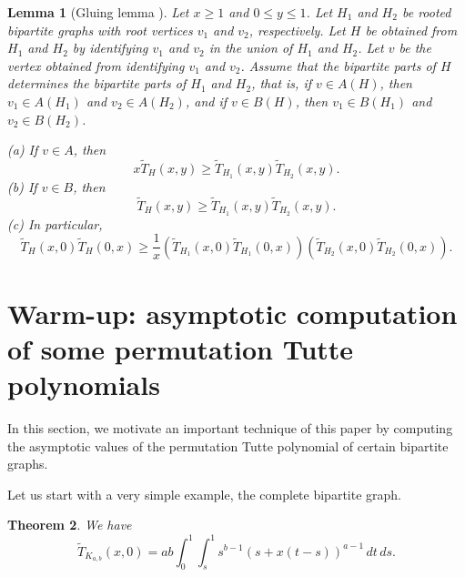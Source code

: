 \documentclass[12pt,a4paper]{amsart}
\numberwithin{equation}{section}
\theoremstyle{plain}
\newtheorem{Th}{Theorem}[section]
\newtheorem{Lemma}[Th]{Lemma}
\theoremstyle{definition}
\newcommand{\1}{\textbf{1}}
\newcommand{\wT}{\widetilde{T}}
\begin{document}
\begin{Lemma}[Gluing lemma \cite{beke2024permutation}] \label{P(H) of glued trees}
Let $x\geqslant1$ and $0\leqslant   y\leqslant   1$.
Let $H_1$ and $H_2$ be rooted bipartite graphs with root vertices $v_1$ and $v_2$, respectively. Let $H$ be obtained from $H_1$ and $H_2$ by identifying $v_1$ and $v_2$ in the union of $H_1$ and $H_2$. Let $v$ be the vertex obtained from identifying $v_1$ and $v_2$. Assume that the bipartite parts of $H$ determines the bipartite parts of $H_1$ and $H_2$, that is, if $v\in A(H)$, then $v_1\in A(H_1)$ and $v_2\in A(H_2)$, and if $v\in B(H)$, then $v_1\in B(H_1)$ and $v_2\in B(H_2)$.
\medskip

\noindent (a) If $v\in A$, then
$$x\widetilde{T}_H(x,y)\geqslant \widetilde{T}_{H_1}(x,y)\widetilde{T}_{H_2}(x,y).$$
\noindent (b) If $v\in B$, then
$$\widetilde{T}_H(x,y)\geqslant \widetilde{T}_{H_1}(x,y)\widetilde{T}_{H_2}(x,y).$$
\noindent (c) In particular,
$$\wT_H(x,0)\wT_H(0,x)\geqslant \frac{1}{x}(\wT_{H_1}(x,0)\wT_{H_1}(0,x))(\wT_{H_2}(x,0)\wT_{H_2}(0,x)).$$
\end{Lemma}


\section{Warm-up: asymptotic computation of some permutation Tutte polynomials}
\label{sect: warm-up}

In this section, we motivate an important technique of this paper by computing the asymptotic values of the permutation Tutte polynomial of certain bipartite graphs.

Let us start with a very simple example, the complete bipartite graph.

\begin{Th}
We have
$$\wT_{K_{a,b}}(x,0)=ab\int_0^1\int_s^1s^{b-1}(s+x(t-s))^{a-1}\, dt \, ds.$$
\end{Th}
\end{document}
